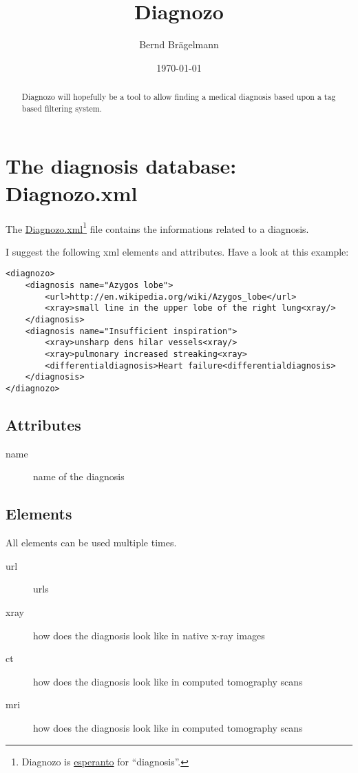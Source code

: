 \documentclass{article}
\title{Diagnozo}
\author{Bernd Brägelmann}
\date{\today}
\begin{document}
\maketitle
\tableofcontents

\begin{abstract}
Diagnozo will hopefully be a tool to allow finding a medical diagnosis based upon a tag based filtering system.
\end{abstract}

\section{The diagnosis database: Diagnozo.xml}

The \href{https://github.com/braegel/Diagnozo/blob/master/data/diagnozo.xml}{Diagnozo.xml}\footnote{Diagnozo is \href{http://en.wikipedia.org/wiki/Esperanto}{esperanto} for ``diagnosis''.} file contains the informations related to a diagnosis.

I suggest the following xml elements and attributes. Have a look at this example:

\lstset{language=xml}
\begin{lstlisting}[caption="First version of Diagnozo.xml",label="firstversionofdiagnozoxml",breaklines=true,frame=tlRB]
<diagnozo>
	<diagnosis name="Azygos lobe">
		<url>http://en.wikipedia.org/wiki/Azygos_lobe</url>
		<xray>small line in the upper lobe of the right lung<xray/>
	</diagnosis>
	<diagnosis name="Insufficient inspiration">
		<xray>unsharp dens hilar vessels<xray/>
		<xray>pulmonary increased streaking<xray>
		<differentialdiagnosis>Heart failure<differentialdiagnosis>
	</diagnosis>
</diagnozo>
\end{lstlisting}

\subsection{Attributes}

\begin{description}
	\item[name] name of the diagnosis
\end{description}

\subsection{Elements}
All elements can be used multiple times.

\begin{description}
	\item[url] urls
	\item[xray] how does the diagnosis look like in native x-ray images
	\item[ct] how does the diagnosis look like in computed tomography scans
	\item[mri] how does the diagnosis look like in computed tomography scans
\end{description}
\end{document}
